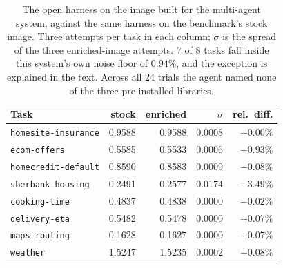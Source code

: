 \begin{table}[t]
\centering
\caption{The open harness on the image built for the multi-agent system, against the same harness on the benchmark's stock image. Three attempts per task in each column; $\sigma$ is the spread of the three enriched-image attempts. 7 of 8 tasks fall inside this system's own noise floor of $0.94\%$, and the exception is explained in the text. Across all 24 trials the agent named none of the three pre-installed libraries.}
\label{tab:matched}
\small
\begin{tabular}{lrrrr}
\toprule
Task & stock & enriched & $\sigma$ & rel.\ diff. \\
\midrule
\texttt{homesite-insurance} & 0.9588 & 0.9588 & 0.0008 & $+0.00\%$ \\
\texttt{ecom-offers} & 0.5585 & 0.5533 & 0.0006 & $-0.93\%$ \\
\texttt{homecredit-default} & 0.8590 & 0.8583 & 0.0009 & $-0.08\%$ \\
\texttt{sberbank-housing} & 0.2491 & 0.2577 & 0.0174 & $-3.49\%$ \\
\texttt{cooking-time} & 0.4837 & 0.4838 & 0.0000 & $-0.02\%$ \\
\texttt{delivery-eta} & 0.5482 & 0.5478 & 0.0000 & $+0.07\%$ \\
\texttt{maps-routing} & 0.1628 & 0.1627 & 0.0000 & $+0.07\%$ \\
\texttt{weather} & 1.5247 & 1.5235 & 0.0002 & $+0.08\%$ \\
\bottomrule
\end{tabular}
\end{table}
